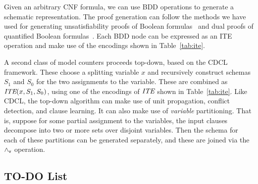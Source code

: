 \documentclass{llncs}
\newcommand{\pand}{\mathbin{\land_{\sf v}}}
\newcommand{\ite}{\mbox{\it ITE}}
\begin{document}
Given an arbitrary CNF formula, we can use BDD operations to generate
a schematic representation.  The proof generation can follow the
methods we have used for generating unsatisfiability proofs of Boolean
formulas~\cite{bryant:tacas:2021} and dual proofs of quantified
Boolean formulas~\cite{bryant:cade:2021}.
Each BDD node can be expressed as an ITE operation and
make use of the encodings shown in Table~\ref{tab:ite}.

A second class of model counters proceeds top-down, based on the CDCL
framework.  These choose a splitting variable $x$ and recursively
construct schemas $S_1$ and $S_0$ for the two assignments to the
variable.  These are combined as $\ite(x, S_1, S_0)$, using one of the
encodings of $\ite$ shown in Table~\ref{tab:ite}.  Like CDCL, the
top-down algorithm can make use of unit propagation, conflict
detection, and clause learning.  It can also make use of {\em
  variable} partitioning.  That is, suppose for some partial
assignment to the variables, the input clauses decompose into two or
more sets over disjoint variables.  Then the schema for each of these
partitions can be generated separately, and these are joined via the $\pand$
operation.



\subsection{TO-DO List}
\end{document}
